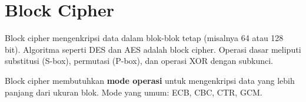 \section{Block Cipher}

Block cipher mengenkripsi data dalam blok-blok tetap (misalnya 64 atau 128 bit). Algoritma seperti DES dan AES adalah block cipher. Operasi dasar meliputi substitusi (S-box), permutasi (P-box), dan operasi XOR dengan subkunci.

Block cipher membutuhkan \textbf{mode operasi} untuk mengenkripsi data yang lebih panjang dari ukuran blok. Mode yang umum: ECB, CBC, CTR, GCM.
